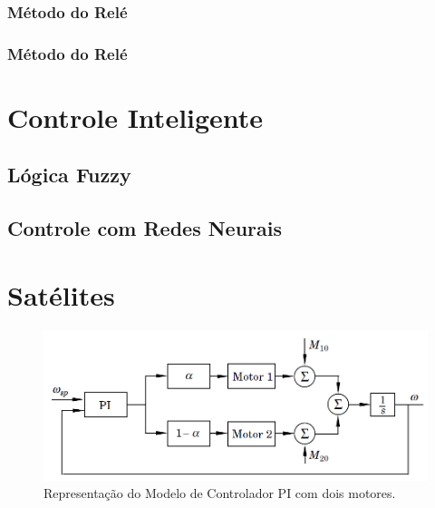 \subsubsection{Método do Relé}

\subsubsection{Método do Relé}


\section{Controle Inteligente}

\subsection{Lógica Fuzzy}

\subsection{Controle com Redes Neurais}  %

\section{Satélites}

\begin{figure}[htb]
  \caption{Representação do Modelo de Controlador PI com dois motores.}
  \begin{center}
      \includegraphics[scale=0.65]{img/pi_twomotors_astrom_p308}
  \end{center}
  \label{fig:pi_twomotors_astrom_p308}
\end{figure}

